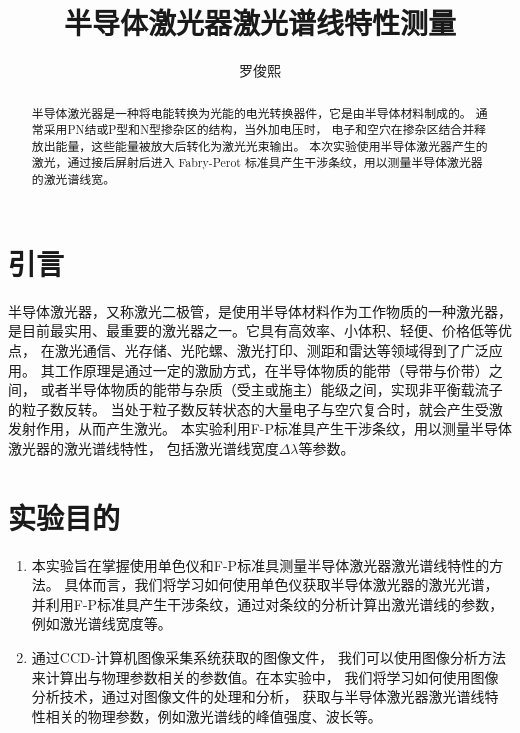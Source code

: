 \documentclass[font=default]{mpltx}
\begin{document}
\title{半导体激光器激光谱线特性测量} %
\author{罗俊熙} %
\date{}
\begin{abstract}
	半导体激光器是一种将电能转换为光能的电光转换器件，它是由半导体材料制成的。
	通常采用PN结或P型和N型掺杂区的结构，当外加电压时，
	电子和空穴在掺杂区结合并释放出能量，这些能量被放大后转化为激光光束输出。
	本次实验使用半导体激光器产生的激光，通过接后屏射后进入 Fabry-Perot 标准具产生干涉条纹，用以测量半导体激光器的激光谱线宽。
\end{abstract}

\maketitle

\section{引言}
半导体激光器，又称激光二极管，是使用半导体材料作为工作物质的一种激光器，
是目前最实用、最重要的激光器之一。它具有高效率、小体积、轻便、价格低等优点，
在激光通信、光存储、光陀螺、激光打印、测距和雷达等领域得到了广泛应用。
其工作原理是通过一定的激励方式，在半导体物质的能带（导带与价带）之间，
或者半导体物质的能带与杂质（受主或施主）能级之间，实现非平衡载流子的粒子数反转。
当处于粒子数反转状态的大量电子与空穴复合时，就会产生受激发射作用，从而产生激光。
本实验利用F-P标准具产生干涉条纹，用以测量半导体激光器的激光谱线特性，
包括激光谱线宽度$\Delta\lambda$等参数。

\section{实验目的}
\begin{enumerate}
	\item 本实验旨在掌握使用单色仪和F-P标准具测量半导体激光器激光谱线特性的方法。
	      具体而言，我们将学习如何使用单色仪获取半导体激光器的激光光谱，
	      并利用F-P标准具产生干涉条纹，通过对条纹的分析计算出激光谱线的参数，
	      例如激光谱线宽度等。
	\item 通过CCD-计算机图像采集系统获取的图像文件，
	      我们可以使用图像分析方法来计算出与物理参数相关的参数值。在本实验中，
	      我们将学习如何使用图像分析技术，通过对图像文件的处理和分析，
	      获取与半导体激光器激光谱线特性相关的物理参数，例如激光谱线的峰值强度、波长等。
\end{enumerate}
\end{document}

